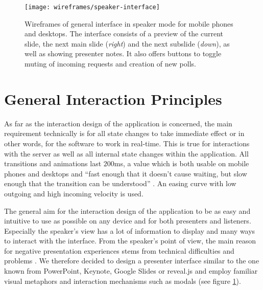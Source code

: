 \begin{figure}
\centering
\texttt{[image: wireframes/speaker-interface]}
\caption{Wireframes of general interface in speaker mode for mobile phones and desktops. The interface consists of a preview of the current slide, the next main slide (\emph{right}) and the next subslide (\emph{down}), as well as showing presenter notes. It also offers buttons to toggle muting of incoming requests and creation of new polls.}
\label{fig:design-interface-presenter}
\end{figure}

\section{General Interaction Principles}
As far as the interaction design of the application is concerned, the main requirement technically is for all state changes to take immediate effect or in other words, for the software to work in real-time. This is true for interactions with the server as well as all internal state changes within the application. All transitions and animations last $200$ms, a value which is both usable on mobile phones and desktops and ``fast enough that it doesn't cause waiting, but slow enough that the transition can be understood'' \cite{GoogleMaterialDesignGuide}. An easing curve with low outgoing and high incoming velocity is used.

The general aim for the interaction design of the application to be as easy and intuitive to use as possible on any device and for both presenters and listeners. Especially the speaker's view has a lot of information to display and many ways to interact with the interface. From the speaker's point of view, the main reason for negative presentation experiences stems from technical difficulties and problems \cite{Wacker:PresenterExperience}. We therefore decided to design a presenter interface similar to the one known from PowerPoint, Keynote, Google Slides or reveal.js and employ familiar visual metaphors and interaction mechanisms such as modals (see figure \ref{}).







